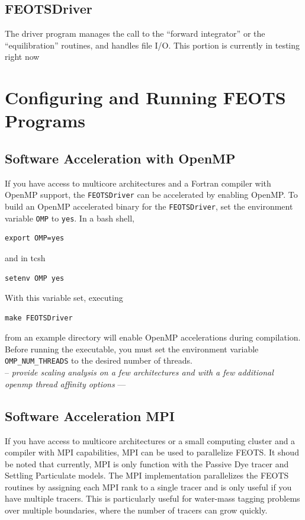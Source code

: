 \documentclass{softwaremanual}
\begin{document}
\section{FEOTSDriver}
The driver program manages the call to the “forward integrator” or the “equilibration” routines, and handles file I/O. This portion is currently in testing right now

\chapter{Configuring and Running FEOTS Programs}

\section{Software Acceleration with OpenMP}
If you have access to multicore architectures and a Fortran compiler with OpenMP support, the \texttt{FEOTSDriver} can be accelerated by enabling OpenMP. To build an OpenMP accelerated binary for the \texttt{FEOTSDriver}, set the environment variable \texttt{OMP} to \texttt{yes}. In a bash shell,
\begin{verbatim}
export OMP=yes
\end{verbatim} 
and in tcsh
\begin{verbatim}
setenv OMP yes
\end{verbatim}
With this variable set, executing
\begin{verbatim}
make FEOTSDriver
\end{verbatim}
from an example directory will enable OpenMP accelerations during compilation. Before running the executable, you must set the environment variable \texttt{OMP\_NUM\_THREADS} to the desired number of threads.\\

-- \textit{ provide scaling analysis on a few architectures and with a few additional openmp thread affinity options } ---

\section{Software Acceleration MPI}
If you have access to multicore architectures or a small computing cluster and a compiler with MPI capabilities, MPI can be used to parallelize FEOTS. It shoud be noted that currently, MPI is only function with the Passive Dye tracer and Settling Particulate models. The MPI implementation parallelizes the FEOTS routines by assigning each MPI rank to a single tracer and is only useful if you have multiple tracers. This is particularly useful for water-mass tagging problems over multiple boundaries, where the number of tracers can grow quickly. 
\end{document}
